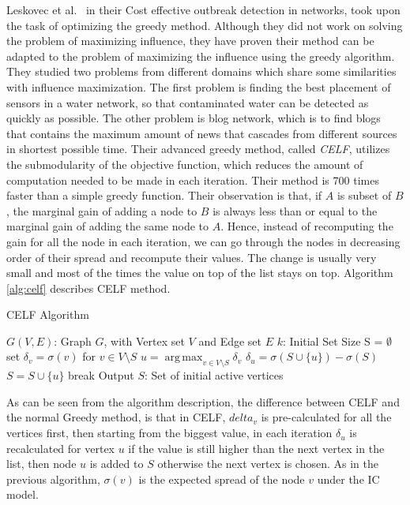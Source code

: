 \documentclass[english]{tktltiki}
\DeclareMathOperator*{\argmax}{arg\,max}
\begin{document}
Leskovec et al.\ \cite{leskovec07}  in their Cost effective outbreak detection in networks, took upon the task of optimizing the greedy method. 
Although they did not work on solving the problem of maximizing influence, they have proven their method can be adapted to the problem of maximizing the influence using the greedy algorithm. 
They studied two problems from different domains which share some similarities with influence maximization. 
The first problem is finding the best placement of sensors in a water network, so that contaminated water can be detected as quickly as possible. 
The other problem is blog network, which is to find blogs that contains the maximum amount of news that cascades from different sources in shortest possible time. 
Their advanced greedy method, called \textit{CELF}, utilizes the submodularity of the objective function, which reduces the amount of computation needed to be made in each iteration. 
Their method is 700 times faster than a simple greedy function. 
Their observation is that, if $A$ is subset of $B$, the marginal gain of adding a node to $B$ is always less than or equal to the marginal gain of adding the same node to $A$. 
Hence, instead of recomputing the gain for all the node in each iteration, we can go through the nodes in decreasing order of their spread and recompute their values.
The change is usually very small and most of the times the value on top of the list stays on top. 
Algorithm \ref{alg:celf} describes CELF method.
\begin{algorithm}[ht!]
\caption{CELF Algorithm \cite{leskovec07}}
\label{alg:celf}
\begin{algorithmic}
\Require $G(V,E)$: Graph $G$, with Vertex set $V$ and Edge set $E$
\Require $k$: Initial Set Size
\State S = $\emptyset$
	\State set $\delta_v = \sigma(v)$ for $v \in V \setminus S$
		\State $u =  \argmax_{v \in V \setminus S}\delta_v$ 
		\State $\delta_u = \sigma( S \cup \{u\}) - \sigma(S)$
			\State $S = S \cup \{u\}$
			\State break
		\EndIf
	\EndWhile 
\EndFor
\State Output $S$: Set of initial active vertices
\end{algorithmic}
\end{algorithm}
As can be seen from the algorithm description, the difference between CELF and the normal Greedy method, is that in CELF, $delta_v$ is pre-calculated for all the vertices first, then starting from the biggest value, in each iteration $\delta_u$ is recalculated for vertex $u$ if the value is still higher than the next vertex in the list, then node $u$ is added to $S$ otherwise the next vertex is chosen. 
As in the previous algorithm, $\sigma(v)$ is the expected spread of the node $v$ under the IC model. 
\end{document}
